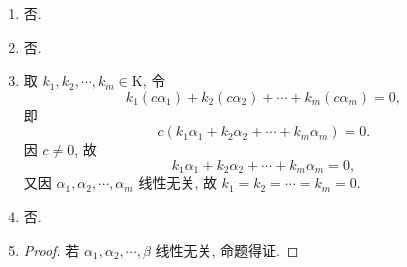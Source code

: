 \begin{enumerate}
\begin{align*}
            \right|
            =
            \left(a+\frac12\right)\left(a^2-\frac12a-\frac12\right)
            = 0.
        \end{align*}
        解得 $a = -\dfrac12$ 或 $a = 1$.
    \item %
        否.
    \item %
        否.
    \item %
        取 $k_1, k_2, \cdots, k_m \in \mathrm{K}$, 令
        \[
            k_1(c\alpha_1) + k_2(c\alpha_2) + \cdots + k_m(c\alpha_m) = 0,    
        \]
        即
        \[
            c(k_1\alpha_1 + k_2\alpha_2 + \cdots + k_m\alpha_m) = 0.   
        \]
        因 $c \not= 0$, 故
        \[
            k_1\alpha_1 + k_2\alpha_2 + \cdots + k_m\alpha_m = 0,   
        \]
        又因 $\alpha_1, \alpha_2, \cdots, \alpha_m$ 线性无关, 故 $k_1 = k_2 = \cdots = k_m = 0$.
    \item %
        否.
    \item %
        \begin{proof}
            若 $\alpha_1, \alpha_2, \cdots, \beta$ 线性无关, 命题得证.


\end{proof}
\end{enumerate}
